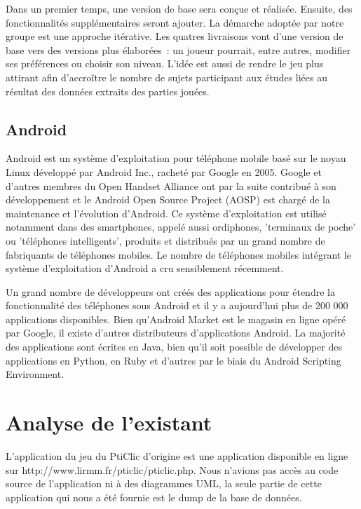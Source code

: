 \documentclass[a4paper,11pt,french]{article}
\begin{document}
Dans un premier temps, une version de base sera conçue et réalisée. Ensuite, des fonctionnalités supplémentaires seront ajouter. La démarche adoptée par notre groupe est une approche itérative. Les quatres livraisons vont d'une version de base vers des versions plus élaborées~: un joueur pourrait, entre autres, modifier ses préférences ou choisir son niveau. L'idée est aussi de rendre le jeu plus attirant afin d'accroître le nombre de sujets participant aux études liées au résultat des données extraits des parties jouées.


\subsection{Android}

Android est un système d'exploitation pour téléphone mobile basé sur le noyau Linux développé par Android Inc., racheté par Google en 2005. Google et d'autres membres du Open Handset Alliance ont par la suite contribué à son développement et le Android Open Source Project (AOSP) est chargé de la maintenance et l'évolution d'Android. Ce système d'exploitation est utilisé notamment dans des smartphones, appelé aussi ordiphones, 'terminaux de poche' ou 'téléphones intelligents', produits et distribués par un grand nombre de fabriquants de téléphones mobiles. Le nombre de téléphones mobiles intégrant le système d'exploitation d'Android a cru sensiblement récemment.

Un grand nombre de développeurs ont créés des applications pour étendre la fonctionnalité des téléphones sous Android et il y a aujourd'hui plus de 200 000 applications disponibles. Bien qu'Android Market est le magasin en ligne opéré par Google, il existe d'autres distributeurs d'applications Android. La majorité des applications sont écrites en Java, bien qu'il soit possible de développer des applications en Python, en Ruby et d'autres par le biais du Android Scripting Environment. 

 
\section{Analyse de l'existant}

L'application du jeu du PtiClic d'origine est une application disponible en ligne sur http://www.lirmm.fr/pticlic/pticlic.php. Nous n'avions pas accès au code source de l'application ni à des diagrammes UML, la seule partie de cette application qui nous a été fournie est le dump de la base de données. 
\end{document}
